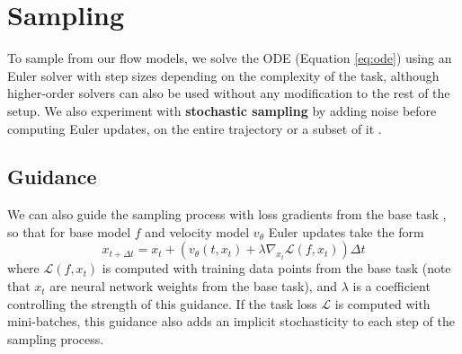 \section{Sampling}

To sample from our flow models, we solve the ODE (Equation \ref{eq:ode}) using an Euler solver with step sizes depending on the complexity of the task, although higher-order solvers can also be used without any modification to the rest of the setup. We also experiment with \textbf{stochastic sampling} by adding noise before computing Euler updates, on the entire trajectory or a subset of it \citep{karrasElucidatingDesignSpace2022}. 

\subsection{Guidance}

We can also guide the sampling process with loss gradients from the base task \citep{wangProteinConformationGeneration2024,kulyteImprovingAntibodyDesign2024,yuForceGuidedBridgeMatching2024a}, so that for base model $f$ and velocity model $v_\theta$ Euler updates take the form 
\begin{equation}
    x_{t + \Delta t} = x_t + \left( v_\theta(t, x_t) + \lambda \nabla_{x_t}\mathcal{L}(f, x_t) \right) \Delta t
\end{equation}
where $\mathcal{L}(f, x_t)$ is computed with training data points from the base task (note that $x_t$ are neural network weights from the base task), and $\lambda$ is a coefficient controlling the strength of this guidance. If the task loss $\mathcal{L}$ is computed with mini-batches, this guidance also adds an implicit stochasticity to each step of the sampling process. 

